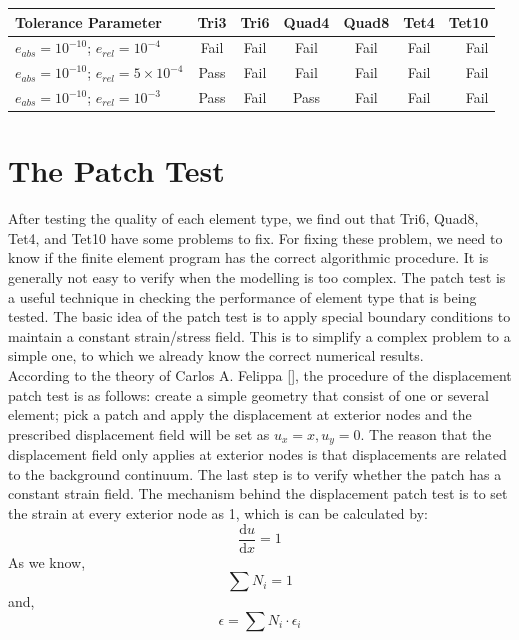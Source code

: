 \begin{tabular}{l*{5}{c}r} 
	\caption{Unit testing for }\label{tab: error}
	Tolerance Parameter              & Tri3 & Tri6 & Quad4 & Quad8 & Tet4  & Tet10  \\
	\hline
	$e_{abs}=10^{-10}$; $e_{rel}=10^{-4}$ & Fail & Fail & Fail & Fail & Fail & Fail   \\
	$e_{abs}=10^{-10}$; $e_{rel}=5\times10^{-4}$&  Pass& Fail & Fail & Fail & Fail &  Fail  \\
	$e_{abs}=10^{-10}$; $e_{rel}=10^{-3}$ & Pass & Fail & Pass & Fail &  Fail & Fail   \\
   \hline
\end{tabular}

\section{The Patch Test}
After testing the quality of each element type, we find out that Tri6, Quad8, Tet4, and Tet10 have some problems to fix. For fixing these problem, we need to know if the finite element program has the correct algorithmic procedure. It is generally not easy to verify when the modelling is too complex. The patch test is a useful technique in checking the performance of element type that is being tested. The basic idea of the patch test is to apply special boundary conditions to maintain a constant strain/stress field. This is to simplify a complex problem to a simple one, to which we already know the correct numerical results. \\
According to the theory of Carlos A. Felippa [\cite{Felippa}], the procedure of the displacement patch test is as follows: create a simple geometry that consist of one or several element; pick a patch and apply the displacement at exterior nodes and the prescribed displacement field will be set as $u_x = x, u_y = 0$. The reason that the displacement field only applies at exterior nodes is that displacements are related to the background continuum. The last step is to verify whether the patch has a constant strain field. The mechanism behind the displacement patch test is to set the strain at every exterior node as 1, which is can be calculated by:
\begin{equation}
\frac{\mathrm d u}{\mathrm d x} = 1
\end{equation}
As we know, 
\begin{equation}
\sum N_i = 1
\end{equation}
and, 
\begin{equation}
\epsilon = \sum N_i \cdot \epsilon_{i}
\end{equation}
